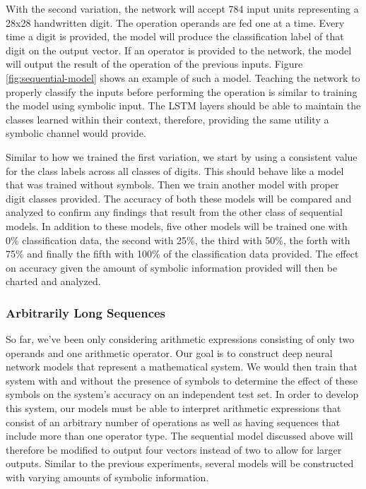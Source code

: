 \documentclass{article}
\begin{document}
	With the second variation, the network will accept 784 input units representing a 28x28 handwritten digit. The operation operands are fed one at a time. Every time a digit is provided, the model will produce the classification label of that digit on the output vector. If an operator is provided to the network, the model will output the result of the operation of the previous inputs. Figure \ref{fig:sequential-model} shows an example of such a model. Teaching the network to properly classify the inputs before performing the operation is similar to training the model using symbolic input. The LSTM layers should be able to maintain the classes learned within their context, therefore, providing the same utility a symbolic channel would provide.
	
	Similar to how we trained the first variation, we start by using a consistent value for the class labels across all classes of digits. This should behave like a model that was trained without symbols. Then we train another model with proper digit classes provided. The accuracy of both these models will be compared and analyzed to confirm any findings that result from the other class of sequential models. In addition to these models, five other models will be trained one with 0\% classification data, the second with 25\%, the third with 50\%, the forth with 75\% and finally the fifth with 100\% of the classification data provided. The effect on accuracy given the amount of symbolic information provided will then be charted and analyzed.
	
	\subsubsection{Arbitrarily Long Sequences}
	
	So far, we've been only considering arithmetic expressions consisting of only two operands and one arithmetic operator. Our goal is to construct deep neural network models that represent a mathematical system. We would then train that system with and without the presence of symbols to determine the effect of these symbols on the system's accuracy on an independent test set. In order to develop this system, our models must be able to interpret arithmetic expressions that consist of an arbitrary number of operations as well as having sequences that include more than one operator type. The sequential model discussed above will therefore be modified to output four vectors instead of two to allow for larger outputs. Similar to the previous experiments, several models will be constructed with varying amounts of symbolic information.
	
\end{document}
